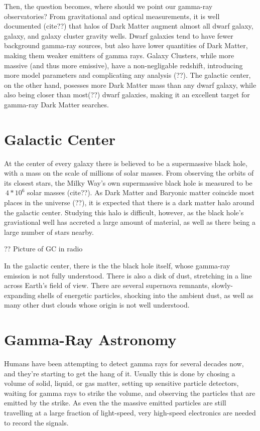 Then, the question becomes, where should we point our gamma-ray observatories?
From gravitational and optical measurements, it is well documented (cite??) that halos of Dark Matter augment almost all dwarf galaxy, galaxy, and galaxy cluster gravity wells.
Dwarf galaxies tend to have fewer background gamma-ray sources, but also have lower quantities of Dark Matter, making them weaker emitters of gamma rays.
Galaxy Clusters, while more massive (and thus more emissive), have a non-negligable redshift, introducing more model parameters and complicating any analysis (??).
The galactic center, on the other hand, posesses more Dark Matter mass than any dwarf galaxy, while also being closer than most(??) dwarf galaxies, making it an excellent target for gamma-ray Dark Matter searches.


\section{Galactic Center}

At the center of every galaxy there is believed to be a supermassive black hole, with a mass on the scale of millions of solar masses.
From observing the orbits of its closest stars, the Milky Way's own supermassive black hole is measured to be $~4*10^6$ solar masses (cite??).
As Dark Matter and Baryonic matter coincide most places in the universe (??), it is expected that there is a dark matter halo around the galactic center.
Studying this halo is difficult, however, as the black hole's graviational well has accreted a large amount of material, as well as there being a large number of stars nearby.

?? Picture of GC in radio

In the galactic center, there is the the black hole itself, whose gamma-ray emission is not fully understood.
There is also a disk of dust, stretching in a line across Earth's field of view.
There are several supernova remnants, slowly-expanding shells of energetic particles, shocking into the ambient dust, as well as many other dust clouds whose origin is not well understood.


\section{Gamma-Ray Astronomy}
Humans have been attempting to detect gamma rays for several decades now, and they're starting to get the hang of it.
Usually this is done by chosing a volume of solid, liquid, or gas matter, setting up sensitive particle detectors, waiting for gamma rays to strike the volume, and observing the particles that are emitted by the strike.
As even the the massive emitted particles are still travelling at a large fraction of light-speed, very high-speed electronics are needed to record the signals.


